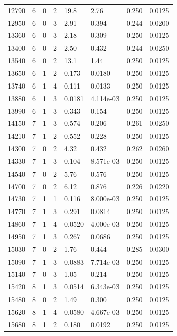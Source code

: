 \documentclass[preview]{standalone}
\begin{document}
{{{{{{\begin{tabular}{L{1.2cm}C{1.2cm} C{0.3cm}C{0.5cm} C{1.4cm}C{1.4cm} C{1.4cm}C{1.4cm}}
  12790  &     6  & 0     &  2 &  19.8  & 2.76  & 0.250 &  0.0125   \\ 
  12950  &     6  & 0     &  3 &  2.91  & 0.394  & 0.244 &  0.0200   \\ 
  13360  &     6  & 0     &  3 &  2.18  & 0.309  & 0.250 &  0.0125   \\ 
  13400  &     6  & 0     &  2 &  2.50  & 0.432  & 0.244 &  0.0250   \\ 
  13540  &     6  & 0     &  2 &  13.1  & 1.44  & 0.250 &  0.0125   \\ 
  13650  &     6  & 1     &  2 &  0.173  & 0.0180  & 0.250 &  0.0125   \\ 
  13740  &     6  & 1     &  4 &  0.111  & 0.0133  & 0.250 &  0.0125   \\ 
  13880  &     6  & 1     &  3 &  0.0181  & 4.114e-03  & 0.250 &  0.0125   \\ 
  13990  &     6  & 1     &  3 &  0.343  & 0.154  & 0.250 &  0.0125   \\ 
  14150  &     7  & 1     &  3 &  0.574  & 0.206  & 0.261 &  0.0250   \\ 
  14210  &     7  & 1     &  2 &  0.552  & 0.228  & 0.250 &  0.0125   \\ 
  14300  &     7  & 0     &  2 &  4.32  & 0.432  & 0.262 &  0.0260   \\ 
  14330  &     7  & 1     &  3 &  0.104  & 8.571e-03  & 0.250 &  0.0125   \\ 
  14540  &     7  & 0     &  2 &  5.76  & 0.576  & 0.250 &  0.0125   \\ 
  14700  &     7  & 0     &  2 &  6.12  & 0.876  & 0.226 &  0.0220   \\ 
  14730  &     7  & 1     &  1 &  0.116  & 8.000e-03  & 0.250 &  0.0125   \\ 
  14770  &     7  & 1     &  3 &  0.291  & 0.0814  & 0.250 &  0.0125   \\ 
  14860  &     7  & 1     &  4 &  0.0520  & 4.000e-03  & 0.250 &  0.0125   \\ 
  14950  &     7  & 1     &  3 &  0.267  & 0.0686  & 0.250 &  0.0125   \\ 
  15030  &     7  & 0     &  2 &  1.76  & 0.444  & 0.285 &  0.0300   \\ 
  15090  &     7  & 1     &  3 &  0.0883  & 7.714e-03  & 0.250 &  0.0125   \\ 
  15140  &     7  & 0     &  3 &  1.05  & 0.214  & 0.250 &  0.0125   \\ 
  15420  &     8  & 1     &  3 &  0.0514  & 6.343e-03  & 0.250 &  0.0125   \\ 
  15480  &     8  & 0     &  2 &  1.49  & 0.300  & 0.250 &  0.0125   \\ 
  15620  &     8  & 1     &  4 &  0.0580  & 4.667e-03  & 0.250 &  0.0125   \\ 
  15680  &     8  & 1     &  2 &  0.180  & 0.0192  & 0.250 &  0.0125   \\ 
\hline 
\end{tabular} 

}}}}}}
\end{document}
